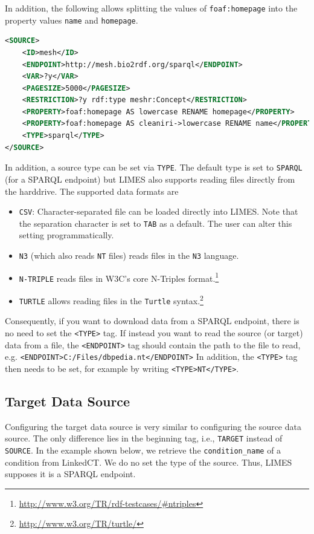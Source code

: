 \documentclass[a4paper, 11pt]{article}
\begin{document}
In addition, the following allows splitting the values of \texttt{foaf:homepage} into the property values \texttt{name} and \texttt{homepage}.

\begin{ttfamily}
\begin{lstlisting}[language=XML,basicstyle=\scriptsize,numberstyle=\tiny]
<SOURCE>
	<ID>mesh</ID>
	<ENDPOINT>http://mesh.bio2rdf.org/sparql</ENDPOINT>
	<VAR>?y</VAR>
	<PAGESIZE>5000</PAGESIZE>
	<RESTRICTION>?y rdf:type meshr:Concept</RESTRICTION>
	<PROPERTY>foaf:homepage AS lowercase RENAME homepage</PROPERTY>
	<PROPERTY>foaf:homepage AS cleaniri->lowercase RENAME name</PROPERTY>
	<TYPE>sparql</TYPE>
</SOURCE>
\end{lstlisting}
\end{ttfamily}

In addition, a source type can be set via \texttt{TYPE}. The default type is set to \texttt{SPARQL} (for a SPARQL endpoint) but LIMES also supports reading files directly from the harddrive. The supported data formats are
\begin{itemize}
\item \texttt{CSV}: Character-separated file can be loaded directly into LIMES. Note that the separation character is set to \texttt{TAB} as a default. The user can alter this setting programmatically. 
\item \texttt{N3} (which also reads \texttt{NT} files) reads files in the \texttt{N3} language.
\item \texttt{N-TRIPLE} reads files in W3C's core N-Triples format.\footnote{\url{http://www.w3.org/TR/rdf-testcases/\#ntriples}}
\item  \texttt{TURTLE} allows reading files in the \texttt{Turtle} syntax.\footnote{\url{http://www.w3.org/TR/turtle/}}
\end{itemize}
Consequently, if you want to download data from a SPARQL endpoint, there is no need to set the \texttt{<TYPE>} tag. 
If instead you want to read the source (or target) data from a file, the \texttt{<ENDPOINT>} tag should contain the path to the file to read, e.g. \texttt{<ENDPOINT>C:/Files/dbpedia.nt</ENDPOINT>}
In addition, the \texttt{<TYPE>} tag then needs to be set, for example by writing \texttt{<TYPE>NT</TYPE>}.
\subsection{Target Data Source}
Configuring the target data source is very similar to configuring the source data source. The only difference lies in the beginning tag, i.e., \texttt{TARGET} instead of \texttt{SOURCE}. In the example shown below, we retrieve the \texttt{condition\_name} of a condition from LinkedCT. We do no set the type of the source. Thus, LIMES supposes it is a SPARQL endpoint.
\end{document}
